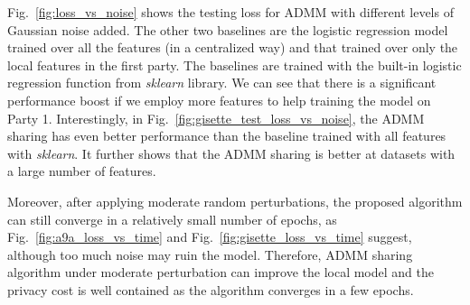 Fig.~\ref{fig:loss_vs_noise} shows the testing loss for ADMM with different levels of Gaussian noise added. The other two baselines are the logistic regression model trained over all the features (in a centralized way) and that trained over only the local features in the first party. The baselines are trained with the built-in logistic regression function from \emph{sklearn} library. We can see that there is a significant performance boost if we employ more features to help training the model on Party 1. Interestingly, in Fig.~\ref{fig:gisette_test_loss_vs_noise}, the ADMM sharing has even better performance than the baseline trained with all features with \emph{sklearn}. It further shows that the ADMM sharing is better at datasets with a large number of features. 

Moreover, after applying moderate random perturbations, the proposed algorithm can still converge in a relatively small number of epochs, as Fig.~\ref{fig:a9a_loss_vs_time} and Fig.~\ref{fig:gisette_loss_vs_time} suggest, although too much noise may ruin the model.
Therefore, ADMM sharing algorithm under moderate perturbation can improve the local model and the privacy cost is well contained as the algorithm converges in a few epochs.


